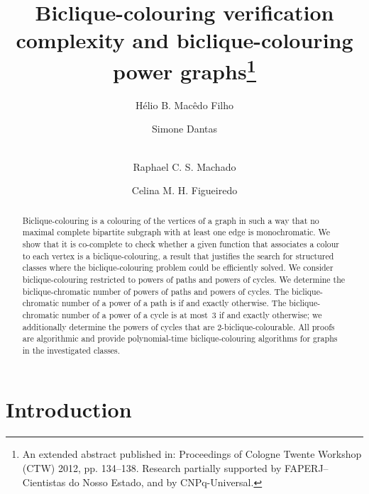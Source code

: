 \documentclass{article}
\begin{document}
\title{Biclique-colouring verification complexity and 
biclique-colouring power graphs\thanks{An extended abstract published in: Proceedings
of Cologne Twente Workshop (CTW) 2012, pp. 134--138.
Research partially supported by FAPERJ--Cientistas do Nosso Estado,
and by CNPq-Universal.}}



\author[1]{H\'elio B. Mac\^edo Filho}
\author[2]{Simone Dantas}
\author[3]{\\ Raphael C. S. Machado}
\author[1]{Celina M. H. Figueiredo}

\date{}

\maketitle

\let\thefootnote\relax\footnotetext{
\hfill\today
}

\begin{abstract}
Biclique-colouring is a colouring of the vertices of a graph in such a way that
no maximal complete bipartite subgraph with at least one edge is monochromatic. 
We show that it is co-complete to check whether a given 
function that associates a colour to each vertex is a biclique-colouring, 
a result that justifies the search for structured classes where the 
biclique-colouring problem could be efficiently solved. We consider 
biclique-colouring restricted to powers of paths and powers of cycles.    
We determine the biclique-chromatic number of
powers of paths and powers of cycles. The biclique-chromatic number of a power
of a path  is  if  and exactly
 otherwise. The biclique-chromatic number of a power of a cycle 
is at most~3 if  and exactly  otherwise; we additionally determine the powers
of cycles that are 2-biclique-colourable. All proofs are algorithmic and
provide polynomial-time biclique-colouring algorithms for graphs in the
investigated classes.
\end{abstract}


\section{Introduction}
\label{s:introduction}
\end{document}
